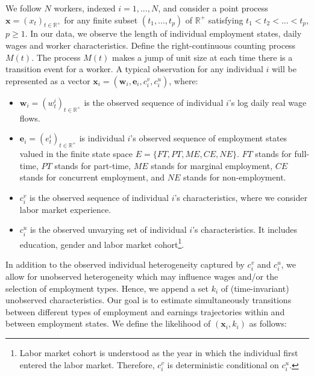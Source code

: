 \documentclass[12pt, a4paper]{article}
\begin{document}
We follow $N$ workers, indexed $i=1,...,N$, and consider a point process \mbox{$\textbf{x}=(x_{t})_{t\in\mathbb{R}^+}$} for any finite subset $(t_1,...,t_p)$ of $\mathbb{R}^+$ satisfying $t_1<t_2<...<t_p$, $p\geq1$. In our data, we observe the length of individual employment states, daily wages and worker characteristics. Define the right-continuous counting process $M(t)$. The process $M(t)$ makes a jump of unit size at each time there is a transition event for a worker. A typical observation for any individual $i$ will be represented as a vector $\textbf{x}_i=(\textbf{w}_i,\textbf{e}_i,c_i^v,c_i^u)$, where:
\vspace{0.2 cm}
\begin{itemize}
\setlength{\itemsep}{0.2 cm}
\item $\textbf{w}_i=(w_{t}^i)_{t\in\mathbb{R}^+}$ is the observed sequence of individual $i$'s log daily real wage flows.
\item $\textbf{e}_i=(e_{t}^i)_{t\in\mathbb{R}^+}$  is individual $i$'s observed sequence of employment states valued in the finite state space $E=\{FT,PT,ME,CE,NE\}$. $FT$ stands for full-time, $PT$ stands for part-time, $ME$ stands for marginal employment, $CE$ stands for concurrent employment, and $NE$ stands for non-employment. 
\item $c_i^v$ is the observed sequence of individual $i$'s characteristics, where we consider labor market experience.
\item $c_i^{u}$ is the observed unvarying set of individual $i$'s characteristics. It includes education, gender and labor market cohort\footnote{Labor market cohort is understood as the year in which the individual first entered the labor market. Therefore, $c_i^v$ is deterministic conditional on $c_i^u$.}.
\end{itemize}
\vspace{0.2 cm}


In addition to the observed individual heterogeneity captured by $c_i^v$ and $c_i^{u}$, we allow for unobserved heterogeneity which may influence wages and/or the selection of employment types. Hence, we append a set $k_i$ of (time-invariant) unobserved characteristics. Our goal is to estimate simultaneously transitions between different types of employment and earnings trajectories within and between employment states. We define the likelihood of $(\textbf{x}_i,k_i)$ as follows:
\end{document}
